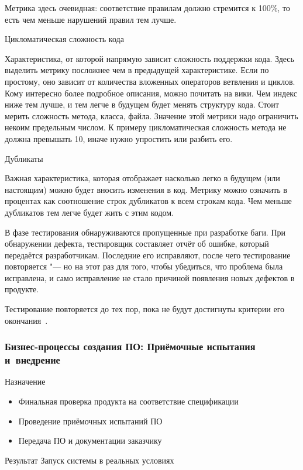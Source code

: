 \documentclass{../industrial-development}
\begin{document}
Метрика здесь очевидная: соответствие правилам должно стремится к 100\%, то есть чем меньше нарушений правил тем лучше.

Цикломатическая сложность кода

Характеристика, от которой напрямую зависит сложность поддержки кода. Здесь выделить метрику посложнее чем в предыдущей характеристике. Если по простому, оно зависит от количества вложенных операторов ветвления и циклов. Кому интересно более подробное описания, можно почитать на вики. Чем индекс ниже тем лучше, и тем легче в будущем будет менять структуру кода. Стоит мерить сложность метода, класса, файла. Значение этой метрики надо ограничить некоим предельным числом. К примеру цикломатическая сложность метода не должна превышать 10, иначе нужно упростить или разбить его.

Дубликаты

Важная характеристика, которая отображает насколько легко в будущем (или настоящим) можно будет вносить изменения в код. Метрику можно означить в процентах как соотношение строк дубликатов к всем строкам кода. Чем меньше дубликатов тем легче будет жить с этим кодом.

В фазе тестирования обнаруживаются пропущенные при разработке баги. При обнаружении дефекта, тестировщик составляет отчёт об ошибке, который передаётся разработчикам. Последние его исправляют, после чего тестирование повторяется "--- но на этот раз для того, чтобы убедиться, что проблема была исправлена, и само исправление не стало причиной появления новых дефектов в продукте.

Тестирование повторяется до тех пор, пока не будут достигнуты критерии его окончания~\cite{Habr2}.


\begin{frame} \frametitle{Бизнес-процессы создания ПО: Приёмочные испытания и~внедрение}
	\begin{block}{Назначение}
		\begin{itemize}
			\item Финальная проверка продукта на соответствие спецификации
			\item Проведение приёмочных испытаний ПО
			\item Передача ПО и документации заказчику
		\end{itemize}
	\end{block}
	\begin{block}{Результат}
		Запуск системы в реальных условиях
	\end{block}
\end{frame}
\end{document}
